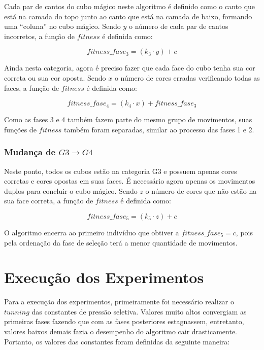 \documentclass[12pt]{article}
\begin{document}
      Cada par de cantos do cubo mágico neste algoritmo é definido como o canto que está na camada do topo junto ao canto que está na camada de baixo, formando uma ``coluna'' no cubo mágico. Sendo $y$ o número de cada par de cantos incorretos, a função de $fitness$ é definida como:

      \begin{equation}
      fitness\_fase_3 = (k_3 \cdot y) + c
      \end{equation}

      Ainda nesta categoria, agora é preciso fazer que cada face do cubo tenha sua cor correta ou sua cor oposta. Sendo $x$ o número de cores erradas verificando todas as faces, a função de $fitness$ é definida como: 

      \begin{equation}
      fitness\_fase_4 = (k_4 \cdot x) + fitness\_fase_3
      \end{equation}

      Como as fases 3 e 4 também fazem parte do mesmo grupo de movimentos, suas funções de $fitness$ também foram separadas, similar ao processo das fases 1 e 2.

    \subsubsection{Mudança de $G3 \to G4$}
      Neste ponto, todos os cubos estão na categoria G3 e possuem apenas cores corretas e cores opostas em suas faces. É necessário agora apenas os movimentos duplos para concluir o cubo mágico. Sendo $z$ o número de cores que não estão na sua face correta, a função de $fitness$ é definida como:

      \begin{equation}
      fitness\_fase_5 = (k_5 \cdot z) + c
      \end{equation}

      O algoritmo encerra ao primeiro indivíduo que obtiver a $fitness\_fase_5 = c$, pois
      pela ordenação da fase de seleção terá a menor quantidade de movimentos.

\section{Execução dos Experimentos}
  Para a execução dos experimentos, primeiramente foi necessário realizar o $tunning$ das constantes de pressão seletiva. Valores muito altos convergiam as primeiras fases fazendo que com as fases posteriores estagnassem, entretanto, valores baixos demais fazia o desempenho do algoritmo cair drasticamente. Portanto, os valores das constantes foram definidas da seguinte maneira:
\end{document}
